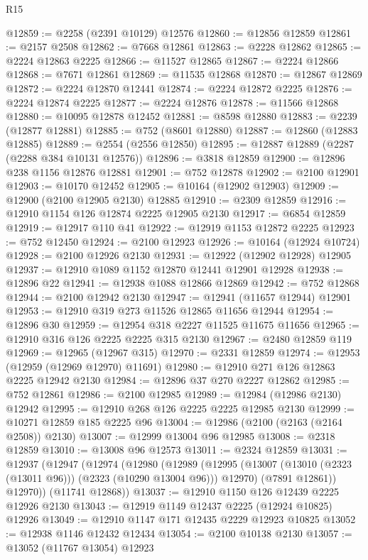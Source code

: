 \begin{lexlean}{R15}
\begin{coremodule}
@12859 := @2258 (@2391 @10129) @12576
@12860 := @12856 @12859
@12861 := @2157 @2508
@12862 := @7668 @12861
@12863 := @2228 @12862
@12865 := @2224 @12863 @2225
@12866 := @11527 @12865
@12867 := @2224 @12866
@12868 := @7671 @12861
@12869 := @11535 @12868
@12870 := @12867 @12869
@12872 := @2224 @12870 @12441
@12874 := @2224 @12872 @2225
@12876 := @2224 @12874 @2225
@12877 := @2224 @12876
@12878 := @11566 @12868
@12880 := @10095 @12878 @12452
@12881 := @8598 @12880
@12883 := @2239 (@12877 @12881)
@12885 := @752 (@8601 @12880)
@12887 := @12860 (@12883 @12885)
@12889 := @2554 (@2556 @12850)
@12895 := @12887 @12889 (@2287 (@2288 @384 @10131 @12576))
@12896 := @3818 @12859
@12900 := @12896 @238 @1156 @12876 @12881
@12901 := @752 @12878
@12902 := @2100 @12901
@12903 := @10170 @12452
@12905 := @10164 (@12902 @12903)
@12909 := @12900 (@2100 @12905 @2130) @12885
@12910 := @2309 @12859
@12916 := @12910 @1154 @126 @12874 @2225 @12905 @2130
@12917 := @6854 @12859
@12919 := @12917 @110 @41
@12922 := @12919 @1153 @12872 @2225
@12923 := @752 @12450
@12924 := @2100 @12923
@12926 := @10164 (@12924 @10724)
@12928 := @2100 @12926 @2130
@12931 := @12922 (@12902 @12928) @12905
@12937 := @12910 @1089 @1152 @12870 @12441 @12901 @12928
@12938 := @12896 @22
@12941 := @12938 @1088 @12866 @12869
@12942 := @752 @12868
@12944 := @2100 @12942 @2130
@12947 := @12941 (@11657 @12944) @12901
@12953 := @12910 @319 @273 @11526 @12865 @11656 @12944
@12954 := @12896 @30
@12959 := @12954 @318 @2227 @11525 @11675 @11656
@12965 := @12910 @316 @126 @2225 @2225 @315 @2130
@12967 := @2480 @12859 @119
@12969 := @12965 (@12967 @315)
@12970 := @2331 @12859
@12974 := @12953 (@12959 (@12969 @12970) @11691)
@12980 := @12910 @271 @126 @12863 @2225 @12942 @2130
@12984 := @12896 @37 @270 @2227 @12862
@12985 := @752 @12861
@12986 := @2100 @12985
@12989 := @12984 (@12986 @2130) @12942
@12995 := @12910 @268 @126 @2225 @2225 @12985 @2130
@12999 := @10271 @12859 @185 @2225 @96
@13004 := @12986 (@2100 (@2163 (@2164 @2508)) @2130)
@13007 := @12999 @13004 @96 @12985
@13008 := @2318 @12859
@13010 := @13008 @96 @12573
@13011 := @2324 @12859
@13031 := @12937
    (@12947
      (@12974
        (@12980
          (@12989
            (@12995 (@13007 (@13010 (@2323 (@13011 @96))) (@2323 (@10290 @13004 @96))) @12970)
            (@7891 @12861))
          @12970))
      (@11741 @12868))
@13037 := @12910 @1150 @126 @12439 @2225 @12926 @2130
@13043 := @12919 @1149 @12437 @2225 (@12924 @10825) @12926
@13049 := @12910 @1147 @171 @12435 @2229 @12923 @10825
@13052 := @12938 @1146 @12432 @12434
@13054 := @2100 @10138 @2130
@13057 := @13052 (@11767 @13054) @12923

\end{coremodule}
\end{lexlean}
